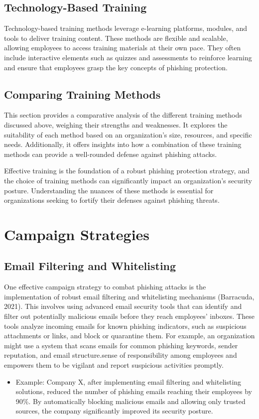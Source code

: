 \documentclass[conference]{IEEEtran}
\begin{document}
\subsection{Technology-Based Training}
Technology-based training methods leverage e-learning platforms, modules, and tools to deliver training content. These methods are flexible and scalable, allowing employees to access training materials at their own pace. They often include interactive elements such as quizzes and assessments to reinforce learning and ensure that employees grasp the key concepts of phishing protection.

\subsection{Comparing Training Methods}
This section provides a comparative analysis of the different training methods discussed above, weighing their strengths and weaknesses. It explores the suitability of each method based on an organization's size, resources, and specific needs. Additionally, it offers insights into how a combination of these training methods can provide a well-rounded defense against phishing attacks.

Effective training is the foundation of a robust phishing protection strategy, and the choice of training methods can significantly impact an organization's security posture. Understanding the nuances of these methods is essential for organizations seeking to fortify their defenses against phishing threats.


\section{ Campaign Strategies }\label{AA}
\subsection{Email Filtering and Whitelisting}

One effective campaign strategy to combat phishing attacks is the implementation of robust email filtering and whitelisting mechanisms (Barracuda, 2021). This involves using advanced email security tools that can identify and filter out potentially malicious emails before they reach employees' inboxes. These tools analyze incoming emails for known phishing indicators, such as suspicious attachments or links, and block or quarantine them. For example, an organization might use a system that scans emails for common phishing keywords, sender reputation, and email structure.sense of responsibility among employees and empowers them to be vigilant and report suspicious activities promptly.
\begin{itemize}
\item Example: Company X, after implementing email filtering and whitelisting solutions, reduced the number of phishing emails reaching their employees by 90\%. By automatically blocking malicious emails and allowing only trusted sources, the company significantly improved its security posture.
\end{itemize}
\end{document}
